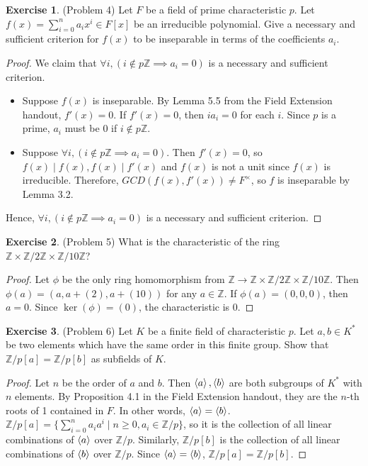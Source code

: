 \documentclass[12pt, psamsfonts]{amsart}
\theoremstyle{definition}
\newtheorem*{exer}{Exercise}
\theoremstyle{remark}
\numberwithin{equation}{section}
\begin{document}
\begin{exer}{(Problem 4)}
  Let $F$ be a field of prime characteristic $p$.
  Let $f(x) = \sum_{i=0}^n a_ix^i \in F[x]$ be an irreducible polynomial.
  Give a necessary and sufficient criterion for $f(x)$ to be inseparable in terms of the coefficients $a_i$.
\end{exer}

\begin{proof}
  We claim that $\forall i, (i \notin p\mathbb{Z} \implies a_i = 0)$ is a necessary and sufficient criterion.
  \begin{itemize}
    \item
      Suppose $f(x)$ is inseparable.
      By Lemma 5.5 from the Field Extension handout, $f'(x) = 0$.
      If $f'(x) = 0$, then $ia_i = 0$ for each $i$.
      Since $p$ is a prime, $a_i$ must be $0$ if $i \notin p\mathbb{Z}$.
    \item
      Suppose $\forall i, (i \notin p\mathbb{Z} \implies a_i = 0)$.
      Then $f'(x) = 0$, so $f(x) \mid f(x), f(x) \mid f'(x)$ and $f(x)$ is not a unit since $f(x)$ is irreducible.
      Therefore, $GCD(f(x), f'(x)) \ne F^{\times}$, so $f$ is inseparable by Lemma 3.2.
  \end{itemize}
  Hence, $\forall i, (i \notin p\mathbb{Z} \implies a_i = 0)$ is a necessary and sufficient criterion.
\end{proof}

\begin{exer}{(Problem 5)}
  What is the characteristic of the ring $\mathbb{Z} \times \mathbb{Z} / 2\mathbb{Z} \times \mathbb{Z} / 10\mathbb{Z}$?
\end{exer}

\begin{proof}
  Let $\phi$ be the only ring homomorphism from $\mathbb{Z} \rightarrow \mathbb{Z} \times \mathbb{Z} / 2\mathbb{Z} \times \mathbb{Z} / 10\mathbb{Z}$.
  Then $\phi(a) = (a, a + (2), a + (10))$ for any $a \in \mathbb{Z}$.
  If $\phi(a) = (0, 0, 0)$, then $a = 0$.
  Since $\ker(\phi) = (0)$, the characteristic is 0.
\end{proof}

\begin{exer}{(Problem 6)}
  Let $K$ be a finite field of characteristic $p$.
  Let $a, b \in K^*$ be two elements which have the same order in this finite group.
  Show that $\mathbb{Z}/p[a] = \mathbb{Z}/p[b]$ as subfields of $K$.
\end{exer}

\begin{proof}
  Let $n$ be the order of $a$ and $b$.
  Then $\ev{ a }, \ev{ b }$ are both subgroups of $K^*$ with $n$ elements.
  By Proposition 4.1 in the Field Extension handout, they are the $n$-th roots of 1 contained in $F$.
  In other words, $\ev{ a } = \ev{ b }$.
  $\mathbb{Z}/p[a] = \{ \sum_{i=0}^{n} a_ia^i \mid n \geq 0, a_i \in \mathbb{Z}/p \}$, so it is the collection of all linear combinations of $\ev{ a }$ over $\mathbb{Z}/p$.
  Similarly, $\mathbb{Z}/p[b]$ is the collection of all linear combinations of $\ev{ b }$ over $\mathbb{Z}/p$.
  Since $\ev{ a } = \ev{ b }$, $\mathbb{Z}/p[a] = \mathbb{Z}/p[b]$.
\end{proof}
\end{document}
